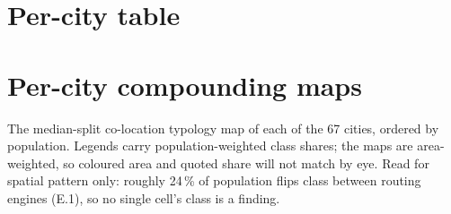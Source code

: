 \documentclass[11pt]{article}
\begin{document}
\clearpage

\section{Per-city table}\label{si:cities}



\clearpage

\section{Per-city compounding maps}\label{si:gallery}

The median-split co-location typology map of each of the 67 cities,
ordered by population. Legends carry population-weighted class shares;
the maps are area-weighted, so coloured area and quoted share will not
match by eye. Read for spatial pattern only: roughly 24\,\% of population
flips class between routing engines (E.1), so no single cell's class is a
finding.


\end{document}
